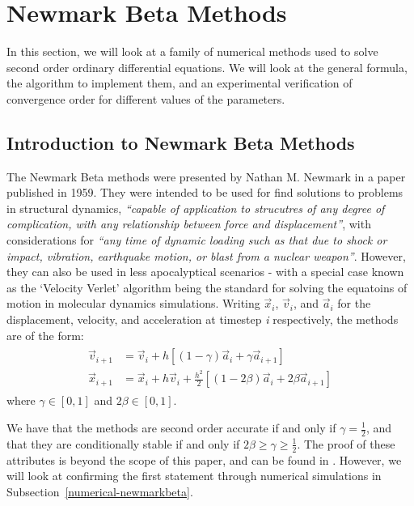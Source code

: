 \documentclass[../Main.tex]{subfiles}
\begin{document}
\section{Newmark Beta Methods}

In this  section, we will look at a family of numerical methods used to solve second order ordinary differential equations. We will look at the general formula, the algorithm to implement them, and an experimental verification of convergence order for different values of the parameters.

\subsection{Introduction to Newmark Beta Methods}
The Newmark Beta methods were presented by Nathan M. Newmark in a paper \cite{Newmark1959} published in 1959. They were intended to be used for find solutions to problems in structural dynamics, \textit{``capable of application to strucutres of any degree of complication, with any relationship between force and displacement''}, with considerations for \textit{``any time of dynamic loading such as that due to shock or impact, vibration, earthquake motion, or blast from a nuclear weapon''}. However, they can also be used in less apocalyptical scenarios -  with a special case known as the `Velocity Verlet' algorithm being the standard for solving the equatoins of motion in molecular dynamics simulations.
Writing $\vec{x}_{i}$, $\vec{v}_{i}$, and $\vec{a}_{i}$ for the displacement, velocity, and acceleration at timestep \textit{i} respectively, the methods are of the form:
\begin{align}
	\begin{split}
		\vec{v}_{i+1} & = \vec{v}_{i} + h\left[\left(1-\gamma \right)\vec{a}_{i} + \gamma \vec{a}_{i+1}\right] \\
		\vec{x}_{i+1} & = \vec{x}_{i} + h\vec{v}_{i} + \frac{h^2}{2}\left[ \left(1-2\beta \right)\vec{a}_{i} + 2\beta \vec{a}_{i+1}\right] 
	\end{split} \label{newmark-beta}
\end{align} where $\gamma \in \left[0, 1 \right]$ and $2\beta \in \left[0, 1 \right]$.  

We have that the methods are second order accurate if and only if $\gamma = \frac{1}{2}$, and that they are conditionally stable if and only if $2\beta \geq \gamma \geq \frac{1}{2}$. The proof of these attributes is beyond the scope of this paper, and can be found in \cite{Newmark1952}. However, we will look at confirming the first statement through numerical simulations in Subsection~\ref{numerical-newmarkbeta}. 
\end{document}
